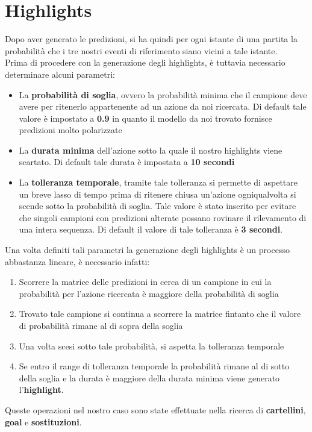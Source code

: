 \section{Highlights}
Dopo aver generato le predizioni, si ha quindi per ogni istante di una partita la probabilità che i tre nostri eventi di riferimento siano vicini a tale istante.
\\Prima di procedere con la generazione degli highlights, è tuttavia necessario determinare alcuni parametri:
\begin{itemize}
\item La \textbf{probabilità di soglia}, ovvero la probabilità minima che il campione deve avere per ritenerlo appartenente ad un azione da noi ricercata. Di default tale valore è impostato a \textbf{0.9} in quanto il modello da noi trovato fornisce predizioni molto polarizzate
\item La \textbf{durata minima} dell'azione sotto la quale il nostro highlights viene scartato. Di default tale durata è impostata a \textbf{10 secondi}
\item La \textbf{tolleranza temporale}, tramite tale tolleranza si permette di aspettare un breve lasso di tempo prima di ritenere chiusa un'azione ogniqualvolta si scende sotto la probabilità di soglia.
Tale valore è stato inserito per evitare che singoli campioni con predizioni alterate possano rovinare il rilevamento di una intera sequenza. Di default il valore di tale tolleranza è \textbf{3 secondi}.
\end{itemize}
Una volta definiti tali parametri la generazione degli highlights è un processo abbastanza lineare, è necessario infatti:
\begin{enumerate}
\item Scorrere la matrice delle predizioni in cerca di un campione in cui la probabilità per l'azione ricercata è maggiore della probabilità di soglia
\item Trovato tale campione si continua a scorrere la matrice fintanto che il valore di probabilità rimane al di sopra della soglia
\item Una volta scesi sotto tale probabilità, si aspetta la tolleranza temporale
\item Se entro il range di tolleranza temporale la probabilità rimane al di sotto della soglia e la durata è maggiore della durata minima viene generato l'\textbf{highlight}.
\end{enumerate}
Queste operazioni nel nostro caso sono state effettuate nella ricerca di \textbf{cartellini}, \textbf{goal} e \textbf{sostituzioni}.
